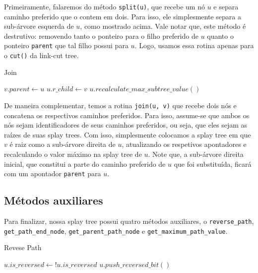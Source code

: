Primeiramente, falaremos do método \texttt{split(u)}, que recebe um nó $u$ e separa caminho preferido que o contem em dois. Para isso, ele simplesmente separa a sub-árvore esquerda de $u$, como mostrado acima. Vale notar que, este método é destrutivo: removendo tanto o ponteiro para o filho preferido de $u$ quanto o ponteiro \texttt{parent} que tal filho possui para $u$. Logo, usamos essa rotina apenas para o \texttt{cut()} da link-cut tree.

\begin{algorithm}[h!]
    \caption{Join}\label{splay:join}
    \begin{algorithmic}
        \State $v.parent \gets u$
        \EndIf
        \State $u.r\_child \gets v$
        \State {}
        \State $u.recalculate\_max\_subtree\_value()$
        \EndFunction
    \end{algorithmic}
\end{algorithm}

De maneira complementar, temos a rotina \texttt{join(u, v)} que recebe dois nós e concatena os respectivos caminhos preferidos. Para isso, assume-se que ambos os nós sejam identificadores de seus caminhos preferidos, ou seja, que eles sejam as raízes de suas splay trees. Com isso, simplesmente colocamos a splay tree em que $v$ é raiz como a sub-árvore direita de $u$, atualizando os respetivos apontadores e recalculando o valor máximo na splay tree de $u$. Note que, a sub-árvore direita inicial, que constitui a parte do caminho preferido de $u$ que foi substituída, ficará com um apontador \texttt{parent} para $u$.

\subsection{Métodos auxiliares}
\label{subsection:lct-splay-aux}

Para finalizar, nossa splay tree possui quatro métodos auxiliares, o \texttt{reverse\_path}, \texttt{get\_path\_end\_node}, \texttt{get\_parent\_path\_node} e \texttt{get\_maximum\_path\_value}.

\begin{algorithm}[h!]
    \caption{Revese Path}\label{splay:reverse-path}
    \begin{algorithmic}
        \State $u.is\_reversed \gets !u.is\_reversed$
        \State $u.push\_reversed\_bit()$ 
        \EndFunction
    \end{algorithmic}
\end{algorithm}

